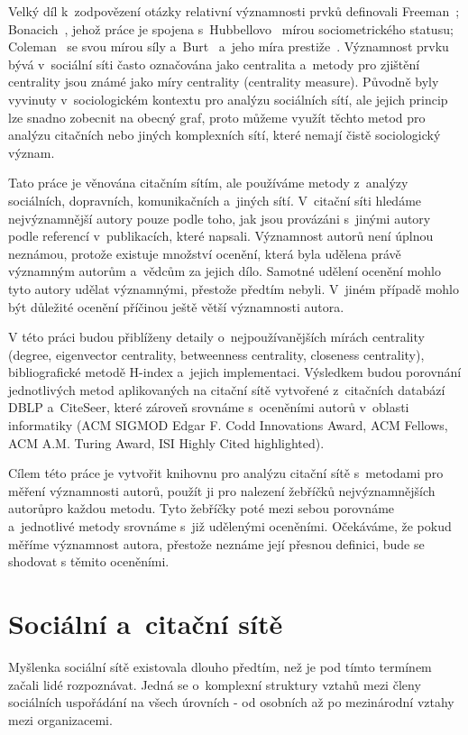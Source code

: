 \documentclass{bakalarka}
\begin{document}
Velký díl k~zodpovězení otázky relativní významnosti prvků definovali
Freeman~\citep{freeman1979}; Bonacich~\citep{bonacich1972}, jehož práce je
spojena s~Hubbellovo~\citep{hubbell1965} mírou sociometrického statusu;
Coleman~\citep{coleman1973} se svou mírou síly a~Burt~\citep{burt1982} a~jeho
míra prestiže~\citep{friedkin1991}. Významnost prvku bývá v~sociální síti často
označována jako centralita a~metody pro zjištění centrality jsou známé jako
míry centrality (centrality measure). Původně byly vyvinuty v~sociologickém
kontextu pro analýzu sociálních sítí, ale jejich princip lze snadno zobecnit na
obecný graf, proto můžeme využít těchto metod pro analýzu citačních nebo jiných
komplexních sítí, které nemají čistě sociologický význam.

Tato práce je věnována citačním sítím, ale používáme metody z~analýzy
sociálních, dopravních, komunikačních a~jiných sítí. V~citační síti hledáme
nejvýznamnější autory pouze podle toho, jak jsou provázáni s~jinými autory
podle referencí v~publikacích, které napsali. Významnost autorů není úplnou
neznámou, protože existuje množství ocenění, která byla udělena právě významným
autorům a~vědcům za jejich dílo. Samotné udělení ocenění mohlo tyto autory
udělat významnými, přestože předtím nebyli. V~jiném případě mohlo být důležité
ocenění příčinou ještě větší významnosti autora. 

V této práci budou přiblíženy detaily o~nejpoužívanějších mírách centrality
(degree, eigenvector centrality, betweenness centrality, closeness centrality),
bibliografické metodě H-index a~jejich implementaci. Výsledkem budou porovnání
jednotlivých metod aplikovaných na citační sítě vytvořené z~citačních databází
DBLP a~CiteSeer, které zároveň srovnáme s~oceněními autorů v~oblasti
informatiky (ACM SIGMOD Edgar F. Codd Innovations Award, ACM Fellows, ACM A.M.
Turing Award, ISI Highly Cited highlighted).

Cílem této práce je vytvořit knihovnu pro analýzu citační sítě s~metodami pro
měření významnosti autorů, použít ji pro nalezení žebříčků nejvýznamnějších
autorůpro každou metodu. Tyto žebříčky poté mezi sebou porovnáme a~jednotlivé
metody srovnáme s~již udělenými oceněními. Očekáváme, že pokud měříme
významnost autora, přestože neznáme její přesnou definici, bude se shodovat s
těmito oceněními.

\chapter{Sociální a~citační sítě}
Myšlenka sociální sítě existovala dlouho předtím, než je pod tímto termínem
začali lidé rozpoznávat. Jedná se o~komplexní struktury vztahů mezi členy
sociálních uspořádání na všech úrovních - od osobních až po mezinárodní vztahy
mezi organizacemi.
\end{document}

